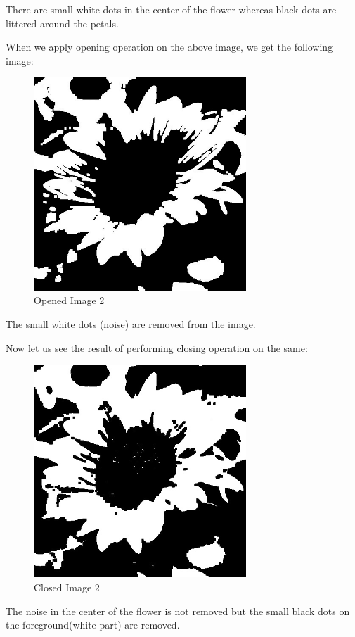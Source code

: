 \documentclass[]{article}
\begin{document}
There are small white dots in the center of the flower whereas black
dots are littered around the petals.

When we apply opening operation on the above image, we get the following image: \\
\begin{figure}[htbp]
	\centering
	\includegraphics[width=8cm]{images/Morphological Operations/Images/Opened sunflower.jpg}
	\caption{Opened Image 2}
\end{figure}

The small white dots (noise) are removed from the image.

Now let us see the result of performing closing operation on the same:
\begin{figure}
	\centering
	\includegraphics[width=8cm]{images/Morphological Operations/Images/Closed sunflower.jpg}
	\caption{Closed Image 2}
\end{figure}

The noise in the center of the flower is not removed but the small black
dots on the foreground(white part) are removed.
\pagebreak
\end{document}
